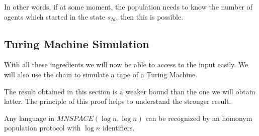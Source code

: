 \documentclass[UKenglish]{llncs}
\begin{document}
\begin{remark}
  In other words, if at some moment, the population needs to know
the number of agents which started in the state $s_{Id}$, then this is
possible.
\end{remark}

\subsection{Turing Machine Simulation}\label{sec:def}

With all these ingredients we will now be able to access to the input
easily. We will also use the chain to simulate a tape of a
Turing Machine. 


The result obtained in this section  is a weaker bound than the one we will obtain latter. The principle of this proof helps to understand the stronger result.

\begin{proposition}
Any language in $MNSPACE(\log n, \log n)$ can be recognized by an homonym population
protocol with $\log n$ identifiers.
\end{proposition}
\end{document}
